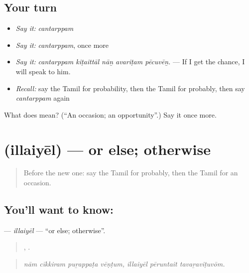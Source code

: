 \subsection*{Your turn}
\begin{itemize}
\raggedright
  \item \emph{Say it:} \emph{cantarppam}
  \item \emph{Say it:} \emph{cantarppam}, once more
  \item \emph{Say it:} \emph{cantarppam kiṭaittāl nāṉ avariṭam pēcuvēṉ.} — If I get the chance, I will speak to him.
  \item \emph{Recall:} say the Tamil for probability, then the Tamil for probably, then say \emph{cantarppam} again
\end{itemize}

\begin{tcolorbox}[breakable,colback=teal!4,colframe=teal!35!black,title={Before you move on}]
What does  mean? (\textquotedblleft{}An occasion; an opportunity\textquotedblright{}.) Say it once more.
\end{tcolorbox}
\section[\texorpdfstring{\ta{இல்லையேல்} (illaiyēl)}{இல்லையேல் (illaiyēl)}]{ (illaiyēl) — or else; otherwise}

\label{lesson:TA-C383-illaiyel}



\begin{quote}
Before the new one: say the Tamil for probably, then the Tamil for an occasion.
\end{quote}

\subsection*{You'll want to know: }
\textbf{} — \emph{illaiyēl} — \textquotedblleft{}or else; otherwise\textquotedblright{}.

\begin{quote}
   ,   .
\end{quote}

\begin{quote}
\emph{nām cīkkiram puṟappaṭa vēṇṭum, illaiyēl pēruntait tavaṟaviṭuvōm.}
\end{quote}

